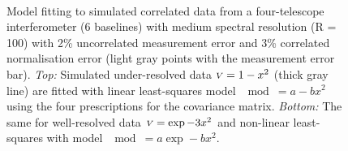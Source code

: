 \documentclass{pasa}
\begin{document}
\begin{figure}
\centering
{}\\
\caption{Model fitting to simulated correlated data from a four-telescope interferometer (6 baselines) with medium spectral resolution (R = 100) with 2\% uncorrelated measurement error and 3\% correlated normalisation error (light gray points with the measurement error bar).  \emph{Top:} Simulated under-resolved data ${\scriptstyle V} = 1-x^2$ (thick gray line) are fitted with linear least-squares model $\mod = a-bx^2$ using the four prescriptions for the covariance matrix. \emph{Bottom:} The same for well-resolved data ${\scriptstyle V} = \exp -3x^2$ and non-linear least-squares with model $\mod = a\exp -bx^2$.}
\end{figure}
\end{document}
